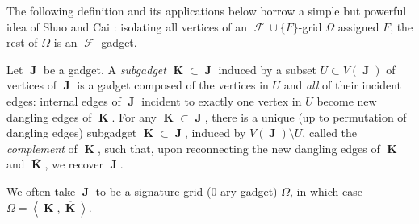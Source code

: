 \documentclass{article}
\DeclareMathOperator{\vk}{\mathbf{K}}
\DeclareMathOperator{\vj}{\mathbf{J}}
\DeclareMathOperator{\fc}{\mathcal{F}}
\begin{document}
The following definition and its applications below borrow a simple but powerful idea of Shao and
Cai \cite[Section 8.2]{shao}: isolating all vertices of an
$\fc \cup \{F\}$-grid $\Omega$ assigned $F$, the rest of $\Omega$ is an $\fc$-gadget. 
\begin{definition}[Subgadget, $\overline{\vk}$]
    Let $\vj$ be a gadget. A \emph{subgadget} $\vk \subset \vj$ induced by a subset $U \subset V(\vj)$ 
    of vertices of $\vj$ is a gadget composed of the vertices in $U$ and 
    \emph{all} of their incident edges: internal edges of $\vj$ incident to 
    exactly one vertex in $U$ become new dangling edges of $\vk$.
    For any $\vk \subset \vj$, there is a
    unique (up to permutation of dangling edges) subgadget
    $\overline{\vk} \subset\vj$, induced by $V(\vj) \setminus U$, called the 
    \emph{complement} of $\vk$, such that, upon reconnecting the new dangling edges of $\vk$ and
    $\overline{\vk}$, we recover $\vj$.

    We often take $\vj$ to be a signature grid (0-ary gadget) $\Omega$, in which case
    $\Omega = \left\langle \vk,\overline{\vk} \right\rangle$.
\end{definition}
\end{document}
